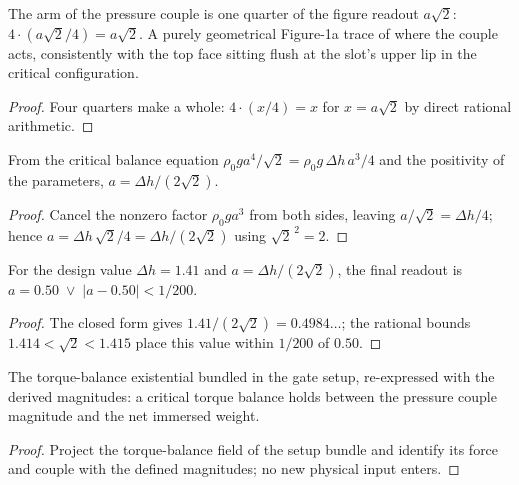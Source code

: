 \begin{lemma}
\label{lem:IPhO2026Problems_problem_IPhO_2026_1_A_1:pressure_couple_position_trace}
The arm of the pressure couple is one quarter of the figure readout
$a\sqrt{2}$: $4 \cdot (a\sqrt{2}/4) = a\sqrt{2}$. A purely geometrical
Figure-1a trace of where the couple acts, consistently with the top face
sitting flush at the slot's upper lip in the critical configuration.
\end{lemma}
\begin{proof}
Four quarters make a whole: $4 \cdot (x/4) = x$ for $x = a\sqrt{2}$ by direct
rational arithmetic.
\end{proof}

\begin{lemma}
\label{lem:IPhO2026Problems_problem_IPhO_2026_1_A_1:side_length_eq_delta_h_over}
From the critical balance equation
$\rho_0 g a^4/\sqrt{2} = \rho_0 g\, \Delta h\, a^3/4$ and the positivity of
the parameters, $a = \Delta h/(2\sqrt{2})$.
\end{lemma}
\begin{proof}
Cancel the nonzero factor $\rho_0 g a^3$ from both sides, leaving
$a/\sqrt{2} = \Delta h/4$; hence $a = \Delta h\, \sqrt{2}/4 =
\Delta h/(2\sqrt{2})$ using $\sqrt{2}^{\,2} = 2$.
\end{proof}

\begin{lemma}[Numerical readout at $\Delta h = 1.41$]
\label{lem:IPhO2026Problems_problem_IPhO_2026_1_A_1:numerical_value}
For the design value $\Delta h = 1.41$ and $a = \Delta h/(2\sqrt{2})$, the
final readout is $a = 0.50 \;\lor\; |a - 0.50| < 1/200$.
\end{lemma}
\begin{proof}
The closed form gives $1.41/(2\sqrt{2}) = 0.4984\ldots$; the rational bounds
$1.414 < \sqrt{2} < 1.415$ place this value within $1/200$ of $0.50$.
\end{proof}

\begin{lemma}
\label{lem:IPhO2026Problems_problem_IPhO_2026_1_A_1:torque_balance_contract}
The torque-balance existential bundled in the gate setup, re-expressed with
the derived magnitudes: a critical torque balance holds between the pressure
couple magnitude and the net immersed weight.
\end{lemma}
\begin{proof}
Project the torque-balance field of the setup bundle and identify its force
and couple with the defined magnitudes; no new physical input enters.
\end{proof}

